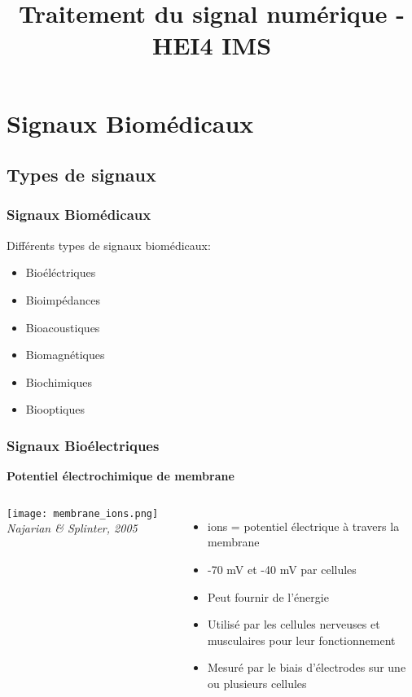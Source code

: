 \documentclass{beamer}
\title[Traitement du signal numérique]{Traitement du signal numérique - HEI4 IMS}
\author[Antony Bazir]{}
\begin{document}
\section{Signaux Biomédicaux}
\subsection{Types de signaux}
\begin{frame}
\frametitle{Signaux Biomédicaux}
Différents types de signaux biomédicaux: \\
\vspace{0.3cm}
\begin{itemize}
\item<2-> Bioéléctriques
\vspace{0.2cm}
\item<3-> Bioimpédances
\vspace{0.2cm}
\item<4-> Bioacoustiques
\vspace{0.2cm}
\item<5-> Biomagnétiques
\vspace{0.2cm}
\item<6-> Biochimiques
\vspace{0.2cm}
\item<7-> Biooptiques
\end{itemize}
\end{frame}

\begin{frame}
\frametitle{Signaux Bioélectriques}
\textbf{Potentiel électrochimique de membrane}
\begin{columns}
\column{60mm}
 \texttt{[image: membrane\_ions.png]}
 \footnotesize \textit{Najarian \& Splinter, 2005}
\column{60mm}
\begin{itemize}
\item ions = potentiel électrique à travers la membrane
\vspace{0.2cm}
\item -70 mV et -40 mV par cellules
\vspace{0.2cm}
\item Peut fournir de l'énergie 
\vspace{0.2cm}
\item Utilisé par les cellules nerveuses et musculaires pour leur fonctionnement
\vspace{0.2cm}
\item Mesuré par le biais d'électrodes sur une ou plusieurs cellules
\end{itemize}
\end{columns}
\end{frame}
\end{document}
